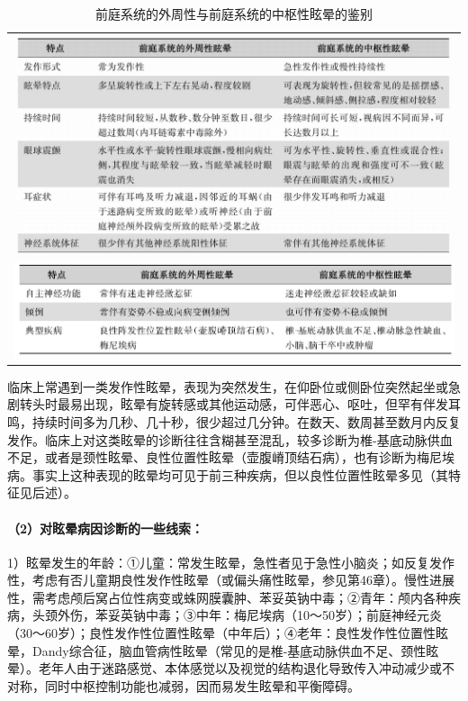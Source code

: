 \begin{longtable}{c}
 \caption{前庭系统的外周性与前庭系统的中枢性眩晕的鉴别}
 \label{tab47-4}
 \endfirsthead
 \caption[]{前庭系统的外周性与前庭系统的中枢性眩晕的鉴别}
 \endhead
 \includegraphics[width=\textwidth,height=\textheight,keepaspectratio]{./images/Image00299.jpg}\\
 \includegraphics[width=\textwidth,height=\textheight,keepaspectratio]{./images/Image00300.jpg}
 \end{longtable}

临床上常遇到一类发作性眩晕，表现为突然发生，在仰卧位或侧卧位突然起坐或急剧转头时最易出现，眩晕有旋转感或其他运动感，可伴恶心、呕吐，但罕有伴发耳鸣，持续时间多为几秒、几十秒，很少超过几分钟。在数天、数周甚至数月内反复发作。临床上对这类眩晕的诊断往往含糊甚至混乱，较多诊断为椎-基底动脉供血不足，或者是颈性眩晕、良性位置性眩晕（壶腹嵴顶结石病），也有诊断为梅尼埃病。事实上这种表现的眩晕均可见于前三种疾病，但以良性位置性眩晕多见（其特征见后述）。

\paragraph{（2）对眩晕病因诊断的一些线索：}

1）眩晕发生的年龄：①儿童：常发生眩晕，急性者见于急性小脑炎；如反复发作性，考虑有否儿童期良性发作性眩晕（或偏头痛性眩晕，参见第46章）。慢性进展性，需考虑颅后窝占位性病变或蛛网膜囊肿、苯妥英钠中毒；②青年：颅内各种疾病，头颈外伤，苯妥英钠中毒；③中年：梅尼埃病（10～50岁）；前庭神经元炎（30～60岁）；良性发作性位置性眩晕（中年后）；④老年：良性发作性位置性眩晕，Dandy综合征，脑血管病性眩晕（常见的是椎-基底动脉供血不足、颈性眩晕）。老年人由于迷路感觉、本体感觉以及视觉的结构退化导致传入冲动减少或不对称，同时中枢控制功能也减弱，因而易发生眩晕和平衡障碍。

